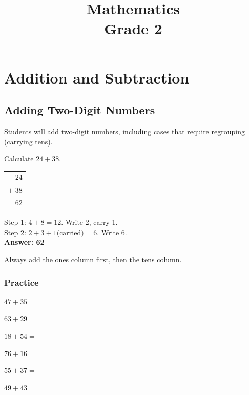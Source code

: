 \documentclass{math_textbook}
\begin{document}
\frontmatter
\title{\Huge\bfseries\color{GradeMain}Mathematics\\[6pt]\large Grade 2}
\author{}
\date{}
\maketitle
\tableofcontents

\mainmatter

\chapter{Addition and Subtraction}

\section{Adding Two-Digit Numbers}

\begin{learningobjective}
Students will add two-digit numbers, including cases that require regrouping (carrying tens).
\end{learningobjective}

\begin{workedexample}
Calculate $24 + 38$.\\[6pt]
\begin{tabular}{r}
  $24$\\
  $+\;38$\\
  \hline
  $62$\\
\end{tabular}
\quad
\begin{minipage}{0.55\textwidth}
\small
Step 1: $4 + 8 = 12$. Write 2, carry 1.\\
Step 2: $2 + 3 + 1\text{(carried)} = 6$. Write 6.\\
\textbf{Answer: 62}
\end{minipage}
\end{workedexample}

\begin{remember}
Always add the ones column first, then the tens column.
\end{remember}

\subsection*{Practice}
\begin{practicegrid}
  \item $47 + 35 =$ \blank
  \item $63 + 29 =$ \blank
  \item $18 + 54 =$ \blank
  \item $76 + 16 =$ \blank
  \item $55 + 37 =$ \blank
  \item $49 + 43 =$ \blank
\end{practicegrid}
\end{document}
